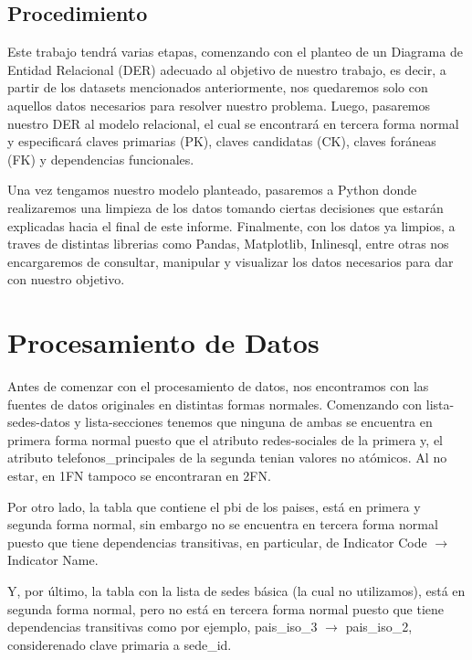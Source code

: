 \documentclass[10pt,a4paper]{article}
\begin{document}
\subsection{Procedimiento} \vspace{0.3cm}

\indent Este trabajo tendrá varias etapas, comenzando con el planteo de un Diagrama de Entidad Relacional (DER) adecuado al objetivo de nuestro trabajo, es decir, a partir de los datasets mencionados anteriormente, nos quedaremos solo con aquellos datos necesarios para resolver nuestro problema. Luego, pasaremos nuestro DER al modelo relacional, el cual se encontrará en tercera forma normal y especificará claves primarias (PK), claves candidatas (CK), claves foráneas (FK) y dependencias funcionales. \par
Una vez tengamos nuestro modelo planteado, pasaremos a Python donde realizaremos una limpieza de los datos tomando ciertas decisiones que estarán explicadas hacia el final de este informe. 
Finalmente, con los datos ya limpios, a traves de distintas librerias como Pandas, Matplotlib, Inlinesql, entre otras nos encargaremos de consultar, manipular y visualizar los datos necesarios para dar con nuestro objetivo.


\newpage

\section{Procesamiento de Datos} \vspace{0.2cm}

Antes de comenzar con el procesamiento de datos, nos encontramos con las fuentes de datos originales en distintas formas normales. Comenzando con lista-sedes-datos y lista-secciones tenemos que ninguna de ambas se encuentra en primera forma normal puesto que el atributo redes-sociales de la primera y, el atributo telefonos\_principales de la segunda tenian valores no atómicos. Al no estar, en 1FN 
tampoco se encontraran en 2FN. \par
Por otro lado, la tabla que contiene el pbi de los paises, está en primera y segunda forma normal, sin embargo no se encuentra en tercera forma normal puesto que tiene dependencias transitivas, en particular, de Indicator Code $\rightarrow$ Indicator Name. \par
Y, por último, la tabla con la lista de sedes básica (la cual no utilizamos), está en segunda forma normal, pero no está en tercera forma normal puesto que tiene dependencias transitivas como por ejemplo, pais\_iso\_3 $\rightarrow$ pais\_iso\_2, considerenado clave primaria
a sede\_id.
\end{document}
